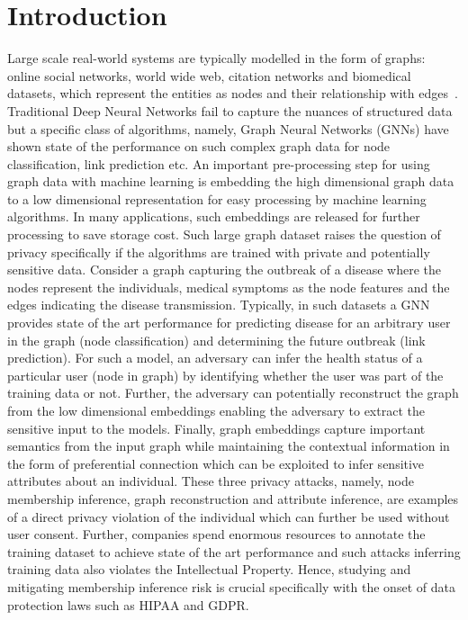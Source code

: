 \section{Introduction}\label{introduction}

Large scale real-world systems are typically modelled in the form of graphs: online social networks, world wide web, citation networks and biomedical datasets, which represent the entities as nodes and their relationship with edges~\cite{zhou2018graph}.
Traditional Deep Neural Networks fail to capture the nuances of structured data but a specific class of algorithms, namely, Graph Neural Networks (GNNs) have shown state of the performance on such complex graph data for node classification, link prediction etc.
An important pre-processing step for using graph data with machine learning is embedding the high dimensional graph data to a low dimensional representation for easy processing by machine learning algorithms.
In many applications, such embeddings are released for further processing to save storage cost.
Such large graph dataset raises the question of privacy specifically if the algorithms are trained with private and potentially sensitive data.
Consider a graph capturing the outbreak of a disease where the nodes represent the individuals, medical symptoms as the node features and the edges indicating the disease transmission.
Typically, in such datasets a GNN provides state of the art performance for predicting disease for an arbitrary user in the graph (node classification) and determining the future outbreak (link prediction).
For such a model, an adversary can infer the health status of a particular user (node in graph) by identifying whether the user was part of the training data or not.
Further, the adversary can potentially reconstruct the graph from the low dimensional embeddings enabling the adversary to extract the sensitive input to the models.
Finally, graph embeddings capture important semantics from the input graph while maintaining the contextual information in the form of preferential connection which can be exploited to infer sensitive attributes about an individual.
These three privacy attacks, namely, node membership inference, graph reconstruction and attribute inference, are examples of a direct privacy violation of the individual which can further be used without user consent. %
Further, companies spend enormous resources to annotate the training dataset to achieve state of the art performance and such attacks inferring training data also violates the Intellectual Property.
Hence, studying and mitigating membership inference risk is crucial specifically with the onset of data protection laws such as HIPAA and GDPR.

